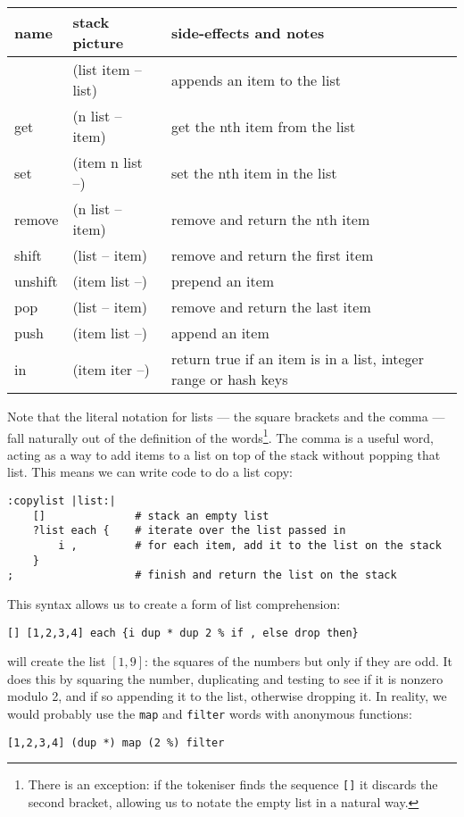 \begin{center}
\begin{tabular}{|l|l|p{4in}|}\hline
\textbf{name} & \textbf{stack picture} & \textbf{side-effects and notes}\\ \hline
[    & (-- list)    & creates a new list\\
,    & (list item -- list) & appends an item to the list\\
]    & (list item -- list) & appends an item to the list\\
get & (n list -- item) & get the nth item from the list\\
set & (item n list --) & set the nth item in the list\\
remove & (n list -- item) & remove and return the nth item\\
shift & (list -- item) & remove and return the first item\\
unshift & (item list --) & prepend an item\\
pop & (list -- item) & remove and return the last item\\
push & (item list --) & append an item\\
in & (item iter --) & return true if an item is in a list, integer range or hash keys\\
\hline
\end{tabular}
\end{center}
Note that the literal notation for lists --- the square brackets and the
comma --- fall naturally out of the definition of the words\footnote{There
is an exception: if the tokeniser finds the sequence \texttt{[]} it discards
the second bracket, allowing us to notate the empty list in a natural way.}.
The comma
is a useful word, acting as a way to add items to a list on top of the stack
without popping that list. This means we can write code to do a list copy:
\begin{lstlisting}
:copylist |list:|
    []              # stack an empty list
    ?list each {    # iterate over the list passed in
        i ,         # for each item, add it to the list on the stack
    }
;                   # finish and return the list on the stack          
\end{lstlisting}
This syntax allows us to create a form of list comprehension:
\begin{lstlisting}
[] [1,2,3,4] each {i dup * dup 2 % if , else drop then}
\end{lstlisting}
will create the list $[1,9]$: the squares of the numbers but only 
if they are odd. It does this by squaring the number, duplicating and
testing to see if it is nonzero modulo 2, and if so appending it to the list,
otherwise dropping it. 
In reality, we would probably use the \texttt{map} and
\texttt{filter} words with anonymous functions:
\begin{lstlisting}
[1,2,3,4] (dup *) map (2 %) filter
\end{lstlisting}



